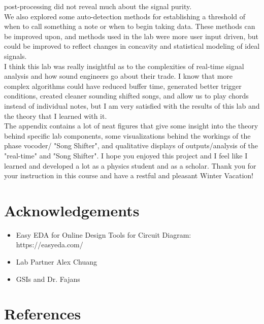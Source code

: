 \documentclass{article}
\begin{document}
post-processing did not reveal much about the signal purity.\\ We also explored some auto-detection methods for establishing a threshold of when to call something a note or when to begin taking data. These methods can be improved upon, and methods used in the lab were more user input driven, but could be improved to reflect changes in concavity and statistical modeling of ideal signals.\\\indent I think this lab was really insightful as to the complexities of real-time signal analysis and how sound engineers go about their trade. I know that more complex algorithms could have reduced buffer time, generated better trigger conditions, created cleaner sounding shifted songs, and allow us to play chords instead of individual notes, but I am very satisfied with the results of this lab and the theory that I learned with it.\\\indent The appendix contains a lot of neat figures that give some insight into the theory behind specific lab components, some visualizations behind the workings of the phase vocoder/ "Song Shifter", and qualitative displays of outputs/analysis of the "real-time" and "Song Shifter". I hope you enjoyed this project and I feel like I learned and developed a lot as a physics student and as a scholar. Thank you for your instruction in this course and have a restful and pleasant Winter Vacation!
\section{Acknowledgements}
    \begin{itemize}
        \item Easy EDA for Online Design Tools for Circuit Diagram: https://easyeda.com/
        \item Lab Partner Alex Chuang
        \item GSIs and Dr. Fajans
    \end{itemize}
\section{References}
    
    

\newpage
\end{document}
